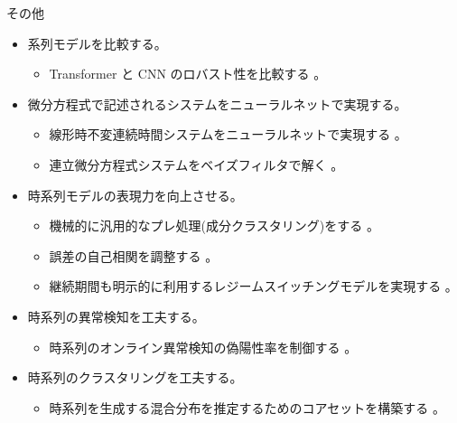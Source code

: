 \documentclass[b5paper,xelatex,ja=standard,10pt]{bxjsarticle}
\begin{document}
\vspace{1pt}
\begin{PROP}[left=0pt]{その他}
\begin{itemize}
  \item 系列モデルを比較する。
  \begin{itemize}
    \item Transformer と CNN のロバスト性を比較する \cite{YutongBai2021}。
  \end{itemize}
  \vspace{6pt}
  \item 微分方程式で記述されるシステムをニューラルネットで実現する。
  \begin{itemize}
    \item 線形時不変連続時間システムをニューラルネットで実現する \cite{AlbertGu2021}。
    \item 連立微分方程式システムをベイズフィルタで解く \cite{JonathanSchmidt2021}。
  \end{itemize}
  \vspace{6pt}
  \item 時系列モデルの表現力を向上させる。
  \begin{itemize}
    \item 機械的に汎用的なプレ処理(成分クラスタリング)をする \cite{ZhiboZhu2021}。
    \item 誤差の自己相関を調整する \cite{FanKengSun2021}。
    \item 継続期間も明示的に利用するレジームスイッチングモデルを実現する \cite{AbdulFatirAnsari2021}。
  \end{itemize}
  \vspace{6pt}
  \item 時系列の異常検知を工夫する。
  \begin{itemize}
    \item 時系列のオンライン異常検知の偽陽性率を制御する \cite{QuentinRebjock2021}。
  \end{itemize}
  \vspace{6pt}
  \item 時系列のクラスタリングを工夫する。
  \begin{itemize}
    \item 時系列を生成する混合分布を推定するためのコアセットを構築する \cite{LingxiaoHuang2021}。
  \end{itemize}
\end{itemize}
\end{PROP}
\vspace{1pt}
\end{document}
